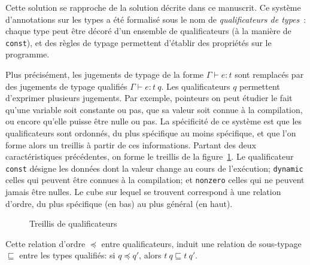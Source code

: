 Cette solution se rapproche de la solution décrite dans ce manuscrit. Ce système
d'annotations sur les types a été formalisé sous le nom de \emph{qualificateurs
de types}~\cite{toplas-quals}: chaque type peut être décoré d'un ensemble de
qualificateurs (à la manière de \texttt{const}), et des règles de typage
permettent d'établir des propriétés sur le programme.

Plus précisément, les jugements de typage de la forme $Γ ⊢ e : t$ sont remplacés
par des jugements de typage qualifiés $Γ ⊢ e : t~q$. Les qualificateurs $q$
permettent d'exprimer plusieurs jugements. Par exemple, pointeurs on peut
étudier le fait qu'une variable soit constante ou pas, que sa valeur soit connue
à la compilation, ou encore qu'elle puisse être nulle ou pas. La spécificité de
ce système est que les qualificateurs sont ordonnés, du plus spécifique au moins
spécifique, et que l'on forme alors un treillis à partir de ces informations.
Partant des deux caractéristiques précédentes, on forme le treillis de la
figure~\ref{fig:cqual-treillis}. Le qualificateur \texttt{const} désigne les
données dont la valeur change au cours de l'exécution; \texttt{dynamic} celles
qui peuvent être connues à la compilation; et \texttt{nonzero} celles qui ne
peuvent jamais être nulles. Le cube sur lequel se trouvent correspond à une
relation d'ordre, du plus spécifique (en bas) au plus général (en haut).

\begin{figure}
\centering
{}

\caption{Treillis de qualificateurs}
\label{fig:cqual-treillis}
\end{figure}

Cette relation d'ordre $\preceq$ entre qualificateurs, induit une relation de
sous-typage $\sqsubseteq$ entre les types qualifiés: si $q \preceq q'$, alors
$t~q \sqsubseteq t~q'$.


